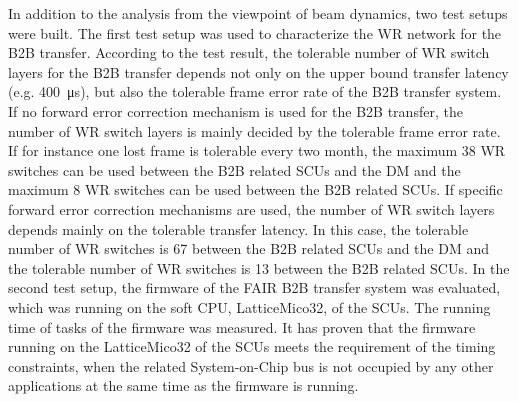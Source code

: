 In addition to the analysis from the viewpoint of beam dynamics, two test setups were built. The first test setup was used to characterize the WR network for the B2B transfer. According to the test result, the tolerable number of WR switch layers for the B2B transfer depends not only on the upper bound transfer latency (e.g. \SI{400}{\us}), but also the tolerable frame error rate of the B2B transfer system. If no forward error correction mechanism is used for the B2B transfer, the number of WR switch layers is mainly decided by the tolerable frame error rate. If for instance one lost frame is tolerable every two month, the maximum 38 WR switches can be used between the B2B related SCUs and the DM and the maximum 8 WR switches can be used between the B2B related SCUs. If specific forward error correction mechanisms are used, the number of WR switch layers depends mainly on the tolerable transfer latency. In this case, the tolerable number of WR switches is 67 between the B2B related SCUs and the DM and the tolerable number of WR switches is 13 between the B2B related SCUs. In the second test setup, the firmware of the FAIR B2B transfer system was evaluated, which was running on the soft CPU, LatticeMico32, of the SCUs. The running time of tasks of the firmware was measured. It has proven that the firmware running on the LatticeMico32 of the SCUs meets the requirement of the timing constraints, when the related System-on-Chip bus is not occupied by any other applications at the same time as the firmware is running.

